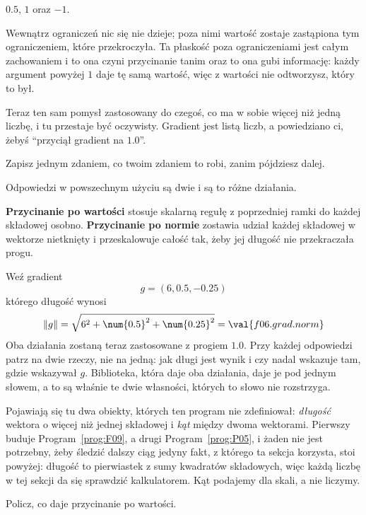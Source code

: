 \begin{fr}
\begin{ansblock}
$\num{0.5}$, $1$ oraz $-1$.
\end{ansblock}

Wewnątrz ograniczeń nic się nie dzieje; poza nimi wartość zostaje zastąpiona
tym ograniczeniem, które przekroczyła. Ta płaskość poza ograniczeniami jest
całym zachowaniem i to ona czyni przycinanie tanim oraz to ona gubi
informację: każdy argument powyżej $1$ daje tę samą wartość, więc z wartości
nie odtworzysz, który to był.

Teraz ten sam pomysł zastosowany do czegoś, co ma w sobie więcej niż jedną
liczbę, i tu przestaje być oczywisty. Gradient jest listą liczb, a
powiedziano ci, żebyś \enquote{przyciął gradient na $\num{1.0}$}.

Zapisz jednym zdaniem, co twoim zdaniem to robi, zanim pójdziesz dalej.
\dotline
\nextframe
\end{fr}

\begin{fr}
\begin{ansblock}
Odpowiedzi w powszechnym użyciu są dwie i są to różne działania.
\end{ansblock}

\textbf{Przycinanie po wartości} stosuje skalarną regułę z poprzedniej ramki do
każdej składowej osobno. \textbf{Przycinanie po normie} zostawia udział każdej
składowej w wektorze nietknięty i przeskalowuje całość tak, żeby jej długość
nie przekraczała progu.

Weź gradient
\[ g = (6, \num{0.5}, -\num{0.25}) \]
którego długość wynosi
\[ \lVert g \rVert = \sqrt{6^{2} + \num{0.5}^{2} + \num{0.25}^{2}}
   = \val{f06.grad.norm} \]
Oba działania zostaną teraz zastosowane z progiem $\num{1.0}$. Przy każdej
odpowiedzi patrz na dwie rzeczy, nie na jedną: jak długi jest wynik i czy nadal
wskazuje tam, gdzie wskazywał $g$. Biblioteka, która daje oba działania, daje
je pod jednym słowem, a to są właśnie te dwie własności, których to słowo nie
rozstrzyga.

\begin{rigourbox}
Pojawiają się tu dwa obiekty, których ten program nie zdefiniował:
\emph{długość} wektora o więcej niż jednej składowej i \emph{kąt} między dwoma
wektorami. Pierwszy buduje Program~\ref{prog:F09}, a drugi
Program~\ref{prog:P05}, i żaden nie jest potrzebny, żeby śledzić dalszy ciąg
\dash{} jedyny fakt, z którego ta sekcja korzysta, stoi powyżej: długość to
pierwiastek z sumy kwadratów składowych, więc każdą liczbę w tej sekcji da się
sprawdzić kalkulatorem. Kąt podajemy dla skali, a nie liczymy.
\end{rigourbox}

Policz, co daje przycinanie po wartości.
\nextframe
\end{fr}

